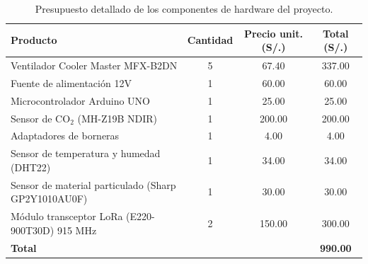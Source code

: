 \begin{table}[H]
    \centering
    \caption{Presupuesto detallado de los componentes de hardware del proyecto.}
    \label{tab:costos_proyecto}
    \small
    \begin{tabular}{|p{6cm}|c|c|c|}
        \hline
        \textbf{Producto} & \textbf{Cantidad} & \textbf{Precio unit. (S/.)} & \textbf{Total (S/.)} \\ \hline
        Ventilador Cooler Master MFX-B2DN & 5 & 67.40 & 337.00 \\ \hline
        Fuente de alimentación 12V & 1 & 60.00 & 60.00 \\ \hline
        Microcontrolador Arduino UNO & 1 & 25.00 & 25.00 \\ \hline
        Sensor de CO\(_2\) (MH-Z19B NDIR) & 1 & 200.00 & 200.00 \\ \hline
        Adaptadores de borneras & 1 & 4.00 & 4.00 \\ \hline
        Sensor de temperatura y humedad (DHT22) & 1 & 34.00 & 34.00 \\ \hline
        Sensor de material particulado (Sharp GP2Y1010AU0F) & 1 & 30.00 & 30.00 \\ \hline
        Módulo transceptor LoRa (E220-900T30D) 915 MHz & 2 & 150.00 & 300.00 \\ \hline
        \multicolumn{3}{|l|}{\textbf{Total}} & \textbf{990.00} \\ \hline
    \end{tabular}
\end{table}